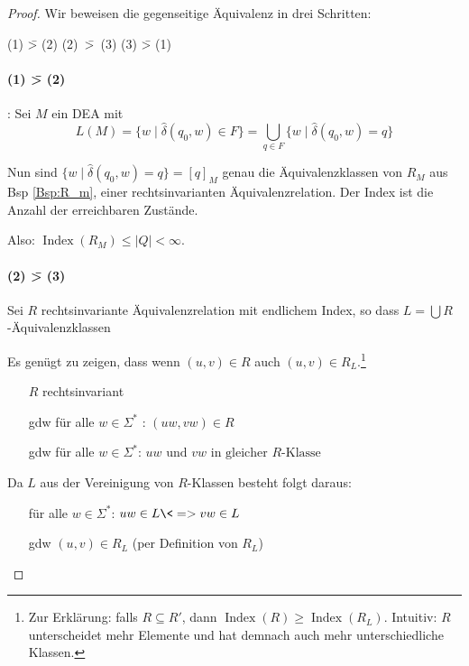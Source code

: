 \begin{proof}
  Wir beweisen die gegenseitige Äquivalenz in drei Schritten:

  \begin{center}
    (1) \=> (2) \quad \mbox{(2) \=> (3)} \quad (3) \=> (1)
  \end{center}

        \paragraph{(1) \=> (2)}: Sei $M$ ein \ac{DEA} mit
  \begin{displaymath}
    L(M)=\{w \mid \hat\delta(q_0,w)\in F \} = \bigcup_{q \in F} \{ w \mid \hat\delta(q_0,w) = q\}
\end{displaymath}

Nun sind $\{ w \mid \hat\delta(q_0,w)=q \} = [q]_M$ genau die Äquivalenzklassen von $R_M$ aus Bsp \ref{Bsp:R_m}, einer rechtsinvarianten Äquivalenzrelation.
Der Index ist die Anzahl der erreichbaren Zustände.

Also: $\operatorname{Index}(R_M) \le |Q| < \infty$.
        
\paragraph{(2) \=> (3)} Sei $R$ rechtsinvariante Äquivalenzrelation mit endlichem Index, so dass $L=\bigcup R$-Äquivalenzklassen
        
Es genügt zu zeigen, dass wenn $(u,v)\in R$ auch $(u,v)\in R_L $.\footnote{
Zur Erklärung: falls $R \subseteq R'$, dann $\operatorname{Index}(R) \ge \operatorname{Index}(R_L)$.
Intuitiv: $R$ unterscheidet mehr Elemente und hat demnach auch mehr unterschiedliche Klassen.}

\begin{itemize}
\item[] $R$ rechtsinvariant
\item[gdw] für alle  $w\in\Sigma^*$ : $(uw,vw)\in R$ 
\item[gdw] für alle $w\in\Sigma^*$: $uw\text{ und $vw$ in gleicher $R$-Klasse}$
\end{itemize}
Da $L$ aus der Vereinigung von $R$-Klassen besteht folgt daraus:
\begin{itemize}
  \item[] für alle $w\in\Sigma^*$: $uw\in L\<=>vw\in L$
  \item[gdw] $(u, v) \in R_L$ (per Definition von $R_L$)
\end{itemize}


\end{proof}
